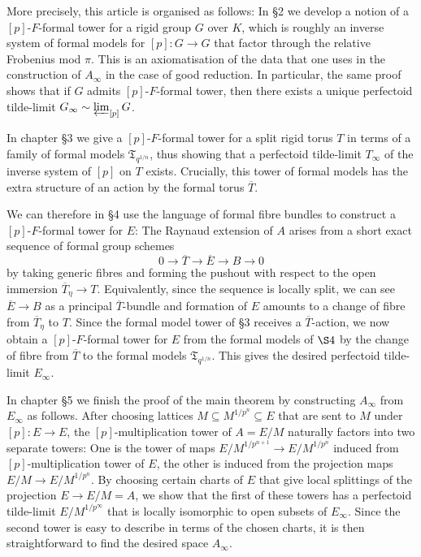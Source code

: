\documentclass[10pt,oneside]{amsart}
\theoremstyle{definition}
\begin{document}
More precisely, this article is organised as follows: In \S2 we develop a notion of a $[p]$-$F$-formal tower for a rigid group $G$ over $K$, which is roughly an inverse system of formal models for $[p]:G\rightarrow G$ that factor through the relative Frobenius mod $\pi$. This is an axiomatisation of the data that one uses in the construction of $A_\infty$ in the case of good reduction. In particular, the same proof shows that if $G$ admits $[p]$-$F$-formal tower, then there exists a unique perfectoid tilde-limit $G_\infty \sim  \varprojlim_{[p]} G$.
 
In chapter \S3 we give a $[p]$-$F$-formal tower for a  split rigid torus $T$ in terms of a family of formal models $\mathfrak T_{q^{1/n}}$, thus showing that a perfectoid tilde-limit $T_\infty$ of the inverse system of $[p]$ on $T$ exists. Crucially, this tower of formal models has the extra structure of an action by the formal torus $\overline{T}$.
 
We can therefore in \S4 use the language of formal fibre bundles to construct a  $[p]$-$F$-formal tower for $E$: The Raynaud extension of $A$ arises from a short exact sequence of formal group schemes
\[0\rightarrow \overline{T}\rightarrow \overline{E}\rightarrow B\rightarrow 0\]
by taking generic fibres and forming the pushout with respect to the open immersion $\overline{T}_\eta\rightarrow T$. Equivalently, since the sequence is locally split, we can see $\overline{E}\rightarrow B$ as a principal $\overline{T}$-bundle and formation of $E$ amounts to a change of fibre from $\overline{T}_\eta$ to $T$. Since the formal model tower of \S3 receives a $\overline{T}$-action, we now obtain a $[p]$-$F$-formal tower for $E$ from the formal models of $\S 4$ by the change of fibre from $\overline{T}$ to the formal models $\mathfrak T_{q^{1/n}}$. This gives the desired perfectoid tilde-limit $E_\infty$.

In chapter \S5 we finish the proof of the main theorem by constructing $A_\infty$ from $E_\infty$ as follows. After choosing lattices $M\subseteq M^{1/p^n}\subseteq E$ that are sent to $M$ under $[p]:E\rightarrow E$, the $[p]$-multiplication tower of $A=E/M$ naturally factors into two separate towers: One is the tower of maps $E/M^{1/p^{n+1}}\rightarrow E/M^{1/p^{n}}$ induced from $[p]$-multiplication tower of $E$, the other is induced from the projection maps $E/M\rightarrow E/M^{1/p^n}$. By choosing certain charts of $E$ that give local splittings of the projection $E\rightarrow E/M=A$, we show that the first of these towers has a perfectoid tilde-limit $E/M^{1/p^\infty}$ that is locally isomorphic to open subsets of $E_\infty$. Since the second tower is easy to describe in terms of the chosen charts, it is then straightforward to find the desired space $A_\infty$.
 
\end{document}
